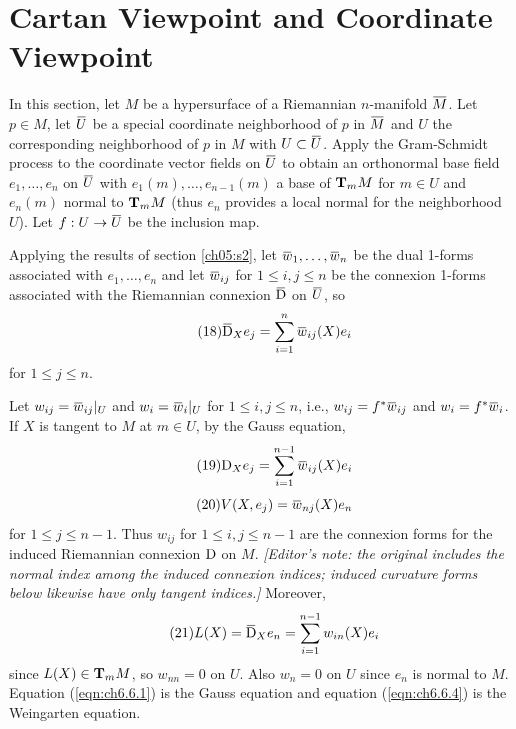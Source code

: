 \documentclass[../main]{subfiles}
\begin{document}
\section{Cartan Viewpoint and Coordinate Viewpoint}\label{ch06:s6}

In this section, let $M$ be a hypersurface of a Riemannian $n$-manifold $\xoverline M$. Let $p\in M$, let $\xoverline U$ be a special coordinate neighborhood of $p$ in $\xoverline M$ and $U$ the corresponding neighborhood of $p$ in $M$ with $U\subset\xoverline U$. Apply the Gram-Schmidt process to the coordinate vector fields on $\xoverline U$ to obtain an orthonormal base field $e_1,\ldots,e_n$ on $\xoverline U$ with $e_1(m),\ldots,e_{n-1}(m)$ a base of $\ts Mm$ for $m\in U$ and $e_n(m)$ normal to $\ts Mm$ (thus $e_n$ provides a local normal for the neighborhood $U$). Let $f:U\functionMaps\xoverline U$ be the inclusion map.

Applying the results of section \ref{ch05:s2}, let $\xoverline w_1,\ldots,\xoverline w_n$ be the dual 1-forms associated with $e_1,\ldots,e_n$ and let $\xoverline w_{ij}$ for $1\le i,j\le n$ be the connexion 1-forms associated with the Riemannian connexion $\covariant$ on $\xoverline U$, so
\begin{equation}\tag{18} \label{eqn:ch6.6.1}
    \covariant_Xe_j = \sum_{i=1}^n \xoverline w_{ij}(X)e_i
\end{equation}
for $1\le j\le n$.

Let $w_{ij}=\xoverline w_{ij}|_U$ and $w_i=\xoverline w_i|_U$ for $1\le i,j\le n$, i.e., $w_{ij}=f^*\xoverline w_{ij}$ and $w_i=f^*\xoverline w_i$. If $X$ is tangent to $M$ at $m\in U$, by the Gauss equation,
\begin{equation} \tag{19}\label{eqn:ch6.6.2}
    \D_Xe_j = \sum_{i=1}^{n-1}\xoverline w_{ij}(X)e_i
\end{equation}
\begin{equation}\tag{20} \label{eqn:ch6.6.3}
    V(X,e_j) = \xoverline w_{nj}(X)e_n
\end{equation}
for $1\le j\le n-1$. Thus $w_{ij}$ for $1\le i,j\le n-1$ are the connexion forms for the induced Riemannian connexion $\D$ on $M$. \emph{[Editor's note: the original includes the normal index among the induced connexion indices; induced curvature forms below likewise have only tangent indices.]} Moreover,
\begin{equation}\tag{21} \label{eqn:ch6.6.4}
    L(X) = \covariant_Xe_n = \sum_{i=1}^{n-1} w_{in}(X)e_i
\end{equation}
since $L(X)\in\ts Mm$, so $w_{nn}=0$ on $U$. Also $w_n=0$ on $U$ since $e_n$ is normal to $M$. Equation (\ref{eqn:ch6.6.1}) is the Gauss equation and equation (\ref{eqn:ch6.6.4}) is the Weingarten equation.
\end{document}
